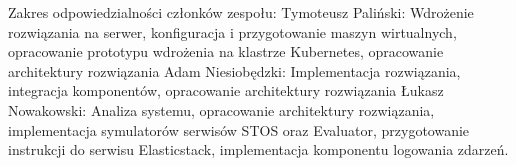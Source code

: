 \documentclass{szablonPG}
\begin{document}


\newpage
\thispagestyle{empty}
\mbox{}
\newpage



\tableofcontents








\printbibliography

\newpage
\thispagestyle{empty}
\noindent Zakres odpowiedzialności członków zespołu:
\newline Tymoteusz Paliński:
\newline Wdrożenie rozwiązania na serwer, konfiguracja i przygotowanie maszyn wirtualnych, opracowanie prototypu wdrożenia na klastrze Kubernetes, opracowanie architektury rozwiązania
\newline Adam Niesiobędzki: 
\newline Implementacja rozwiązania, integracja komponentów, opracowanie architektury rozwiązania
\newline Łukasz Nowakowski:
\newline Analiza systemu, opracowanie architektury rozwiązania, implementacja symulatorów serwisów STOS oraz Evaluator, przygotowanie instrukcji do serwisu Elasticstack, implementacja komponentu logowania zdarzeń.
\newpage
\end{document}
